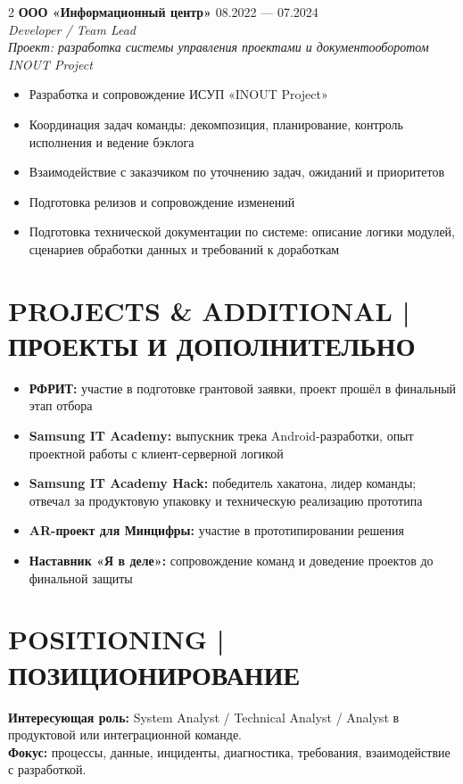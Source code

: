 \documentclass[9pt,a4paper]{article}
\begin{document}
\begin{paracol}{2}
\textbf{ООО «Информационный центр»} \hfill 08.2022 --- 07.2024\\
\textit{Developer / Team Lead}\\
\textit{Проект: разработка системы управления проектами и документооборотом INOUT Project}
\begin{itemize}
  \item Разработка и сопровождение ИСУП «INOUT Project»
  \item Координация задач команды: декомпозиция, планирование, контроль исполнения и ведение бэклога
  \item Взаимодействие с заказчиком по уточнению задач, ожиданий и приоритетов
  \item Подготовка релизов и сопровождение изменений
  \item Подготовка технической документации по системе: описание логики модулей, сценариев обработки данных и требований к доработкам
\end{itemize}

\section*{PROJECTS \& ADDITIONAL | ПРОЕКТЫ И ДОПОЛНИТЕЛЬНО}
\begin{itemize}
  \item \textbf{РФРИТ:} участие в подготовке грантовой заявки, проект прошёл в финальный этап отбора
  \item \textbf{Samsung IT Academy:} выпускник трека Android-разработки, опыт проектной работы с клиент-серверной логикой
  \item \textbf{Samsung IT Academy Hack:} победитель хакатона, лидер команды; отвечал за продуктовую упаковку и техническую реализацию прототипа
  \item \textbf{AR-проект для Минцифры:} участие в прототипировании решения
  \item \textbf{Наставник «Я в деле»:} сопровождение команд и доведение проектов до финальной защиты
\end{itemize}

\section*{POSITIONING | ПОЗИЦИОНИРОВАНИЕ}
\textbf{Интересующая роль:} System Analyst / Technical Analyst / Analyst в продуктовой или интеграционной команде.\\
\textbf{Фокус:} процессы, данные, инциденты, диагностика, требования, взаимодействие с разработкой.

\end{paracol}
\end{document}
